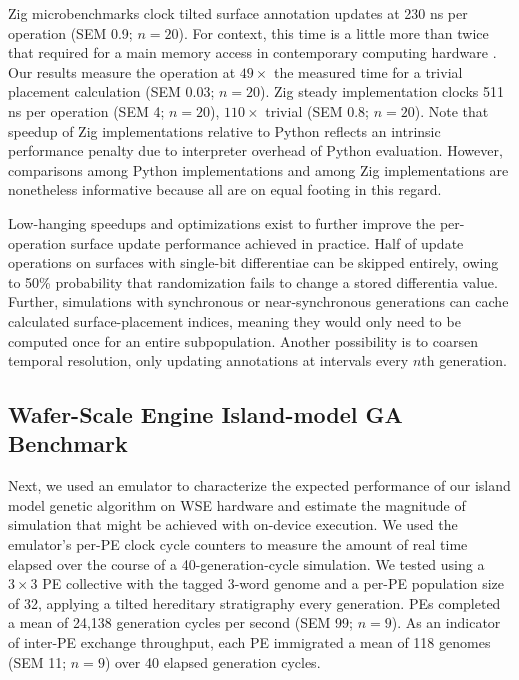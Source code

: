 Zig microbenchmarks clock tilted surface annotation updates at 230 ns per operation (SEM 0.9; $n=20$).
For context, this time is a little more than twice that required for a main memory access in contemporary computing hardware \citep{markus2022memory}.
Our results measure the operation at $49\times$ the measured time for a trivial placement calculation (SEM 0.03; $n=20$).
Zig steady implementation clocks 511 ns per operation (SEM 4; $n=20$), $110\times$ trivial (SEM 0.8; $n=20$).
Note that speedup of Zig implementations relative to Python reflects an intrinsic performance penalty due to interpreter overhead of Python evaluation.
However, comparisons among Python implementations and among Zig implementations are nonetheless informative because all are on equal footing in this regard.


Low-hanging speedups and optimizations exist to further improve the per-operation surface update performance achieved in practice.
Half of update operations on surfaces with single-bit differentiae can be skipped entirely, owing to 50\% probability that randomization fails to change a stored differentia value.
Further, simulations with synchronous or near-synchronous generations can cache calculated surface-placement indices, meaning they would only need to be computed once for an entire subpopulation.
Another possibility is to coarsen temporal resolution, only updating annotations at intervals every $n$th generation.

\subsection{Wafer-Scale Engine Island-model GA Benchmark}

Next, we used an emulator to characterize the expected performance of our island model genetic algorithm on WSE hardware and estimate the magnitude of simulation that might be achieved with on-device execution.
We used the emulator's per-PE clock cycle counters to measure the amount of real time elapsed over the course of a 40-generation-cycle simulation.
We tested using a $3\times3$ PE collective with the tagged 3-word genome and a per-PE population size of 32, applying a tilted hereditary stratigraphy every generation.
PEs completed a mean of 24,138 generation cycles per second (SEM 99; $n=9$).
As an indicator of inter-PE exchange throughput, each PE immigrated a mean of 118 genomes (SEM 11; $n=9$) over 40 elapsed generation cycles.


